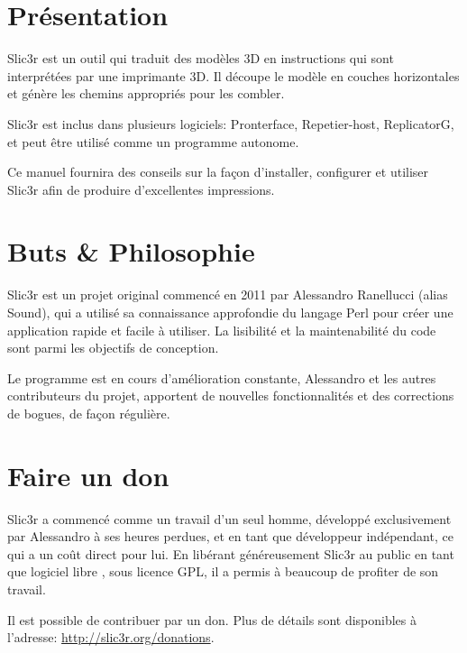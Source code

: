 
\section{Pr\'esentation} %
\label{sec:overview}

Slic3r est un outil qui traduit des mod\`eles 3D en instructions qui sont interpr\'et\'ees par une imprimante 3D. Il d\'ecoupe le mod\`ele en couches horizontales et g\'en\`ere les chemins appropri\'es pour les combler.

Slic3r est inclus dans plusieurs logiciels: Pronterface, Repetier-host, ReplicatorG, et peut \^etre utilis\'e comme un programme autonome.

Ce manuel fournira des conseils sur la fa\c{c}on d'installer, configurer et utiliser Slic3r afin de produire d'excellentes impressions.



\section{Buts \& Philosophie} %
\label{sec:goals_philosophy}

Slic3r est un projet original commenc\'e en 2011 par Alessandro Ranellucci (alias Sound), qui a utilis\'e sa connaissance approfondie du langage Perl pour cr\'eer une application rapide et facile \`a utiliser. La lisibilit\'e et la maintenabilit\'e du code sont parmi les objectifs de conception.

Le programme est en cours d'am\'elioration constante, Alessandro et les autres contributeurs du projet, apportent de nouvelles fonctionnalit\'es et des corrections de bogues, de fa\c{c}on r\'eguli\`ere.



\section{Faire un don} %
\label{sec:donating}

Slic3r a commenc\'e comme un travail d'un seul homme, d\'evelopp\'e exclusivement par Alessandro \`a ses heures perdues, et en tant que d\'eveloppeur ind\'ependant, ce qui a un co\^ut direct pour lui. En lib\'erant g\'en\'ereusement Slic3r au public en tant que logiciel libre , sous licence GPL, il a permis \`a beaucoup de profiter de son travail.

Il est possible de contribuer par un don. Plus de d\'etails sont disponibles \`a l'adresse: \url{http://slic3r.org/donations}.

